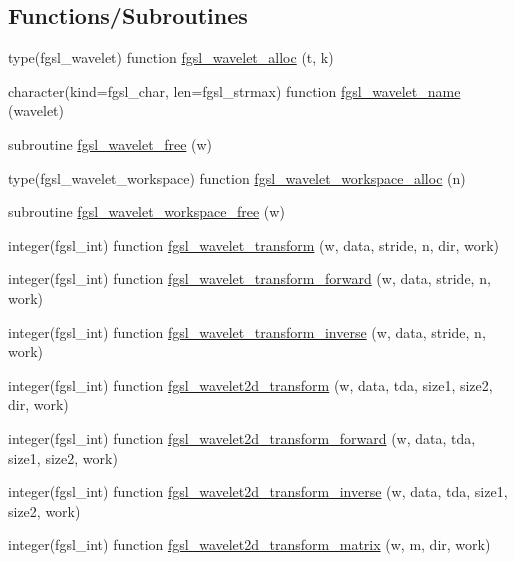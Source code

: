 \subsection*{Functions/\+Subroutines}
\begin{DoxyCompactItemize}
\item 
type(fgsl\+\_\+wavelet) function \hyperlink{wavelet_8finc_a0534f5b9d5db58fc98d3996bf7eefc20}{fgsl\+\_\+wavelet\+\_\+alloc} (t, k)
\item 
character(kind=fgsl\+\_\+char, len=fgsl\+\_\+strmax) function \hyperlink{wavelet_8finc_a2ff5880cd29c1fa264f815fda096f4ab}{fgsl\+\_\+wavelet\+\_\+name} (wavelet)
\item 
subroutine \hyperlink{wavelet_8finc_af843924a1fcec19d66e6c2aa89b6fb71}{fgsl\+\_\+wavelet\+\_\+free} (w)
\item 
type(fgsl\+\_\+wavelet\+\_\+workspace) function \hyperlink{wavelet_8finc_aa120476a77ed63c701cb8cf8fc575409}{fgsl\+\_\+wavelet\+\_\+workspace\+\_\+alloc} (n)
\item 
subroutine \hyperlink{wavelet_8finc_a8877c7b5815c334ab195f6517273a91e}{fgsl\+\_\+wavelet\+\_\+workspace\+\_\+free} (w)
\item 
integer(fgsl\+\_\+int) function \hyperlink{wavelet_8finc_a3dd1ffd5ce0dd32861b9221f6afae511}{fgsl\+\_\+wavelet\+\_\+transform} (w, data, stride, n, dir, work)
\item 
integer(fgsl\+\_\+int) function \hyperlink{wavelet_8finc_a70c8c242811e478cebb88eb3b27788ab}{fgsl\+\_\+wavelet\+\_\+transform\+\_\+forward} (w, data, stride, n, work)
\item 
integer(fgsl\+\_\+int) function \hyperlink{wavelet_8finc_a34094547d54cf81dc906fff09ceb1a44}{fgsl\+\_\+wavelet\+\_\+transform\+\_\+inverse} (w, data, stride, n, work)
\item 
integer(fgsl\+\_\+int) function \hyperlink{wavelet_8finc_ae721627d9553cf0c2d1396e45d1fb146}{fgsl\+\_\+wavelet2d\+\_\+transform} (w, data, tda, size1, size2, dir, work)
\item 
integer(fgsl\+\_\+int) function \hyperlink{wavelet_8finc_a0ae200617e842d153159591b59cc56b5}{fgsl\+\_\+wavelet2d\+\_\+transform\+\_\+forward} (w, data, tda, size1, size2, work)
\item 
integer(fgsl\+\_\+int) function \hyperlink{wavelet_8finc_a05d7bb6ada598550a9df3b0a0cdfdb05}{fgsl\+\_\+wavelet2d\+\_\+transform\+\_\+inverse} (w, data, tda, size1, size2, work)
\item 
integer(fgsl\+\_\+int) function \hyperlink{wavelet_8finc_abbe205405ba63a585d68d1e3f5db5903}{fgsl\+\_\+wavelet2d\+\_\+transform\+\_\+matrix} (w, m, dir, work)

\end{DoxyCompactItemize}
